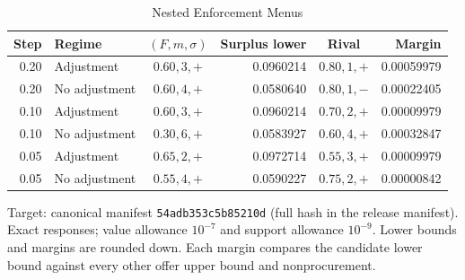 \begin{table}[t]
\caption{Nested Enforcement Menus}\label{tab:menus}
\centering
\footnotesize
\begin{tabular}{@{}rlcrcr@{}}
\toprule
Step & Regime & $(F,m,\sigma)$ & Surplus lower & Rival & Margin \\
\midrule
0.20 & Adjustment & $0.60,3,+$ & 0.0960214 & $0.80,1,+$ & 0.00059979 \\
0.20 & No adjustment & $0.60,4,+$ & 0.0580640 & $0.80,1,-$ & 0.00022405 \\
0.10 & Adjustment & $0.60,3,+$ & 0.0960214 & $0.70,2,+$ & 0.00009979 \\
0.10 & No adjustment & $0.30,6,+$ & 0.0583927 & $0.60,4,+$ & 0.00032847 \\
0.05 & Adjustment & $0.65,2,+$ & 0.0972714 & $0.55,3,+$ & 0.00009979 \\
0.05 & No adjustment & $0.55,4,+$ & 0.0590227 & $0.75,2,+$ & 0.00000842 \\
\bottomrule
\end{tabular}
\par\smallskip\begin{minipage}{\linewidth}\footnotesize Target: canonical manifest \texttt{54adb353c5b85210d} (full hash in the release manifest). Exact responses; value allowance $10^{-7}$ and support allowance $10^{-9}$. Lower bounds and margins are rounded down. Each margin compares the candidate lower bound against every other offer upper bound and nonprocurement.\end{minipage}
\end{table}
